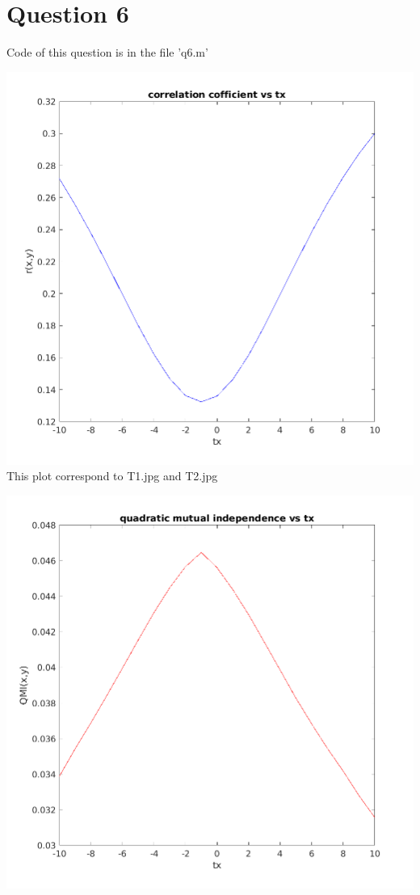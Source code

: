 \documentclass{article}
\theoremstyle{remark}
\begin{document}
\section{Question 6}
Code of this question is in the file 'q6.m' \par
\includegraphics[width=\textwidth, height=\textheight, keepaspectratio]{cor_cof1.png}
 {This plot correspond to T1.jpg and T2.jpg}

\includegraphics[width=\textwidth, height=\textheight, keepaspectratio]{quadMutInf1.png}
\end{document}
